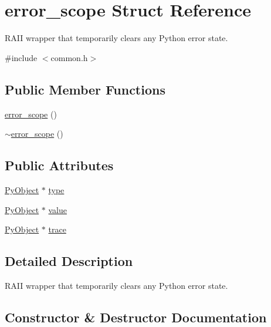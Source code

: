\hypertarget{structerror__scope}{}\section{error\+\_\+scope Struct Reference}
\label{structerror__scope}


R\+A\+II wrapper that temporarily clears any Python error state.  




{\ttfamily \#include $<$common.\+h$>$}

\subsection*{Public Member Functions}
\begin{DoxyCompactItemize}
\item 
\mbox{\hyperlink{structerror__scope_a29ada2ba40991dc044d0cb4a80f5d778}{error\+\_\+scope}} ()
\item 
\mbox{\hyperlink{structerror__scope_adf7d91c85c84bb66dbb58a228e2c3d3e}{$\sim$error\+\_\+scope}} ()
\end{DoxyCompactItemize}
\subsection*{Public Attributes}
\begin{DoxyCompactItemize}
\item 
\mbox{\hyperlink{_python27_2object_8h_aadc84ac7aed2cfa6f20c25f62bf3dac7}{Py\+Object}} $\ast$ \mbox{\hyperlink{structerror__scope_a79197309ef17cd8e22f6d1ab931126d9}{type}}
\item 
\mbox{\hyperlink{_python27_2object_8h_aadc84ac7aed2cfa6f20c25f62bf3dac7}{Py\+Object}} $\ast$ \mbox{\hyperlink{structerror__scope_a191a65d0531431b7eba0886cd4702c88}{value}}
\item 
\mbox{\hyperlink{_python27_2object_8h_aadc84ac7aed2cfa6f20c25f62bf3dac7}{Py\+Object}} $\ast$ \mbox{\hyperlink{structerror__scope_abdf5b7a557de4eae94a9b5d30ae7de00}{trace}}
\end{DoxyCompactItemize}


\subsection{Detailed Description}
R\+A\+II wrapper that temporarily clears any Python error state. 

\subsection{Constructor \& Destructor Documentation}
\mbox{\label{structerror__scope_a29ada2ba40991dc044d0cb4a80f5d778}} 
